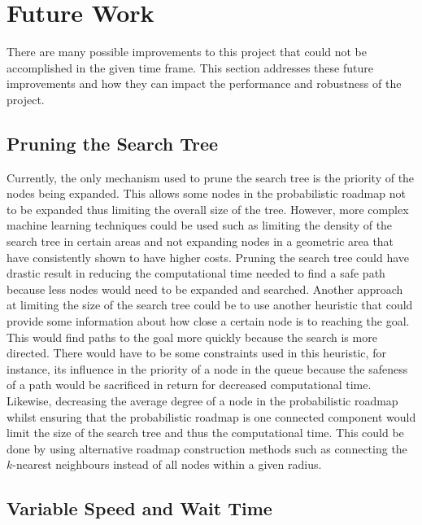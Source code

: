 \documentclass[letterpaper, 10pt, conference]{ieeeconf}
\begin{document}
\section{Future Work}

There are many possible improvements to this project that could not be
accomplished in the given time frame. This section addresses these future
improvements and how they can impact the performance and robustness of the
project.

\subsection{Pruning the Search Tree}

Currently, the only mechanism used to prune the search tree is the priority of
the nodes being expanded. This allows some nodes in the probabilistic roadmap
not to be expanded thus limiting the overall size of the tree. However, more
complex machine learning techniques could be used such as limiting the density
of the search tree in certain areas and not expanding nodes in a geometric area
that have consistently shown to have higher costs. Pruning the search tree
could have drastic result in reducing the computational time needed to find a
safe path because less nodes would need to be expanded and searched. Another
approach at limiting the size of the search tree could be to use another
heuristic that could provide some information about how close a certain node is
to reaching the goal. This would find paths to the goal more quickly because
the search is more directed. There would have to be some constraints used in
this heuristic, for instance, its influence in the priority of a node in the
queue because the safeness of a path would be sacrificed in return for
decreased computational time. Likewise, decreasing the average degree of a node
in the probabilistic roadmap whilst ensuring that the probabilistic roadmap is
one connected component would limit the size of the search tree and thus the
computational time.  This could be done by using alternative roadmap
construction methods such as connecting the $k$-nearest neighbours instead of
all nodes within a given radius.

\subsection{Variable Speed and Wait Time}
\end{document}
